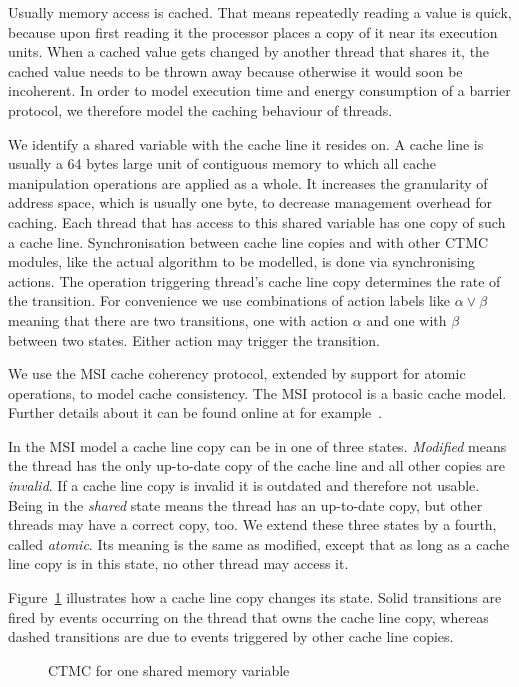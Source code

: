 \documentclass[a4paper, 10pt]{article}
\begin{document}
Usually memory access is cached. That means repeatedly reading a value is quick, because upon first reading it the processor places a copy of it near its execution units. When a cached value gets changed by another thread that shares it, the cached value needs to be thrown away because otherwise it would soon be incoherent.
In order to model execution time and energy consumption of a barrier protocol, we therefore model the caching behaviour of threads.

We identify a shared variable with the cache line it resides on. A cache line is usually a 64 bytes large unit of contiguous memory to which all cache manipulation operations are applied as a whole. It increases the granularity of address space, which is usually one byte, to decrease management overhead for caching.
Each thread that has access to this shared variable has one copy of such a cache line.
Synchronisation between cache line copies and with other CTMC modules, like the actual algorithm to be modelled, is done via synchronising actions. The operation triggering thread's cache line copy determines the rate of the transition.
For convenience we use combinations of action labels like $\alpha \lor \beta$ meaning that there are two transitions, one with action $\alpha$ and one with $\beta$ between two states. Either action may trigger the transition.

We use the MSI cache coherency protocol, extended by support for atomic operations, to model cache consistency. The MSI protocol is a basic cache model. Further details about it can be found online at for example~\cite{msi}.

In the MSI model a cache line copy can be in one of three states. \emph{Modified} means the thread has the only up-to-date copy of the cache line and all other copies are \emph{invalid}. If a cache line copy is invalid it is outdated and therefore not usable. Being in the \emph{shared} state means the thread has an up-to-date copy, but other threads may have a correct copy, too. We extend these three states by a fourth, called \emph{atomic}. Its meaning is the same as modified, except that as long as a cache line copy is in this state, no other thread may access it.

Figure~\ref{fig:model-shared-memory} illustrates how a cache line copy changes its state. Solid transitions are fired by events occurring on the thread that owns the cache line copy, whereas dashed transitions are due to events triggered by other cache line copies.

\begin{figure}[htbp]
	\centering
	
	\caption{CTMC for one shared memory variable}
	\label{fig:model-shared-memory}
\end{figure}
\end{document}
